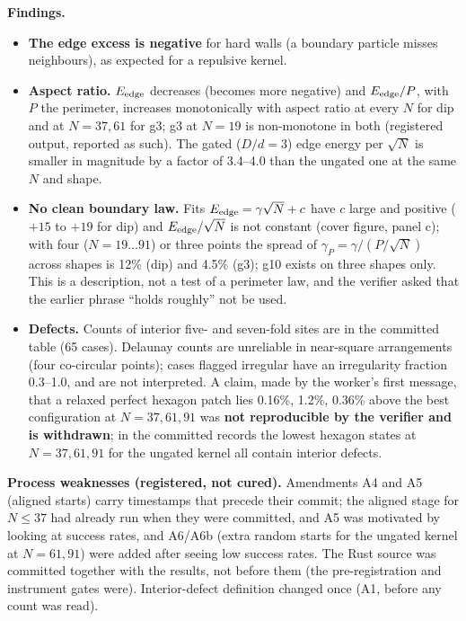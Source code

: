 \documentclass[11pt,a4paper]{article}
\begin{document}
\textbf{Findings.}
\begin{itemize}[leftmargin=1.2em,itemsep=1pt]
\item \textbf{The edge excess is negative} for hard walls (a boundary particle misses neighbours), as expected for a repulsive kernel.
\item \textbf{Aspect ratio.} $E_{\rm edge}$ decreases (becomes more negative) and $E_{\rm edge}/P$, with $P$ the perimeter, increases monotonically with
aspect ratio at every $N$ for dip and at $N=37,61$ for g3; g3 at $N=19$ is non-monotone in both (registered output, reported as such). The gated ($D/d=3$) edge energy per $\sqrt N$ is smaller in magnitude by a factor of 3.4--4.0 than the ungated one at the same $N$ and shape.
\item \textbf{No clean boundary law.} Fits $E_{\rm edge}=\gamma\sqrt N+c$ have $c$ large and positive ($+15$ to $+19$ for dip) and
$E_{\rm edge}/\sqrt N$ is not constant (cover figure, panel c); with four ($N=19\ldots91$) or three points the spread of $\gamma_P=\gamma/(P/\sqrt N)$
across shapes is 12\% (dip) and 4.5\% (g3); g10 exists on three shapes only. This is a description, not a test of a perimeter law, and the verifier asked that the earlier
phrase ``holds roughly'' not be used.
\item \textbf{Defects.} Counts of interior five- and seven-fold sites are in the committed table (65 cases). Delaunay counts are
unreliable in near-square arrangements (four co-circular points); cases flagged irregular have an irregularity fraction 0.3--1.0, and
are not interpreted. A claim, made by the worker's first message, that a relaxed perfect hexagon patch lies 0.16\%, 1.2\%, 0.36\%
above the best configuration at $N=37,61,91$ was \textbf{not reproducible by the verifier and is withdrawn}; in the committed records
the lowest hexagon states at $N=37,61,91$ for the ungated kernel all contain interior defects.
\end{itemize}

\textbf{Process weaknesses (registered, not cured).} Amendments A4 and A5 (aligned starts) carry timestamps that precede their
commit; the aligned stage for $N\le37$ had already run when they were committed, and A5 was motivated by looking at success rates, and A6/A6b (extra random starts for the ungated kernel at $N=61,91$) were added after seeing
low success rates. The
Rust source was committed together with the results, not before them (the pre-registration and instrument gates were). Interior-defect
definition changed once (A1, before any count was read).
\end{document}
